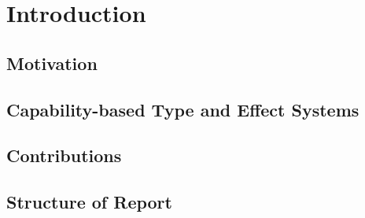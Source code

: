 \section{Introduction}

\subsection{Motivation}

\subsection{Capability-based Type and Effect Systems}

\subsection{Contributions}

\subsection{Structure of Report}
